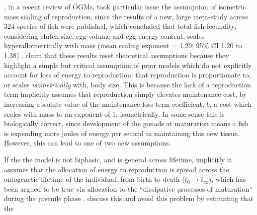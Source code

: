 \documentclass[a4paper]{article} %
\begin{document}
        \cite{Marshall2019b}, in a recent review of OGMs, took particular issue the assumption of isometric mass scaling of reproduction, since the results of a new, large meta-study across 324 species of fish were published, which concluded that total fish fecundity, considering clutch size, egg volume and egg energy content, scales hyperallometrically with mass (mean scaling exponent = 1.29; 95\% CI 1.20 to 1.38) \autocite{Barneche2018d}. \cite{Marshall2019b} claim that these results reset theoretical assumptions because they highlight a simple but critical assumption of prior models which do not explicitly account for loss of energy to reproduction: that reproduction is proportionate to, or scales \textit{isometrically} with, body size. This is because the lack of a reproduction term implicitly assumes that reproduction simply elevates maintenance cost, by increasing absolute value of the maintenance loss term coefficient, $b$, a cost which scales with mass to an exponent of 1, isometrically. In some sense this is biologically correct, since development of the gonads at maturation means a fish is expending more joules of energy per second in maintaining this new tissue. However, this can lead to one of two new assumptions. 
        
        If the the model is not biphasic, and is general across lifetime, implicitly it assumes that the allocation of energy to reproduction is spread across the ontogenetic lifetime of the individual, from birth to death ($t_0 \rightarrow t_{\infty}$), which has been argued to be true via allocation to the ``dissipative processes of maturation'' during the juvenile phase \autocite{Kearney2019}. \cite{West2001} discuss this and avoid this problem by estimating that the 
        
\end{document}
